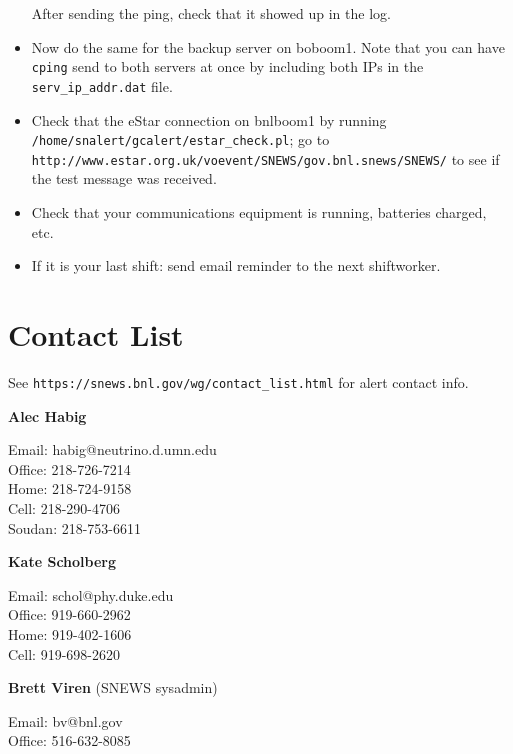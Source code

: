 \documentclass{article}
\begin{document}
\begin{itemize}
After sending the ping, check that it showed up in the log. 

\item Now do the same for the backup server on boboom1.  Note that you 
can have \texttt{cping}
send to both servers at once by including both IPs in the 
\texttt{serv\_ip\_addr.dat} file.

\item Check that the eStar connection on bnlboom1 by running
\texttt{/home/snalert/gcalert/estar\_check.pl}; go to
\texttt{http://www.estar.org.uk/voevent/SNEWS/gov.bnl.snews/SNEWS/} to see
if the test message was received.

\item Check that your communications equipment is running,
batteries charged, etc.

\item If it is your last shift: send email reminder to the
next shiftworker.

\end{itemize}

\newpage

\section{Contact List}      


See \texttt{https://snews.bnl.gov/wg/contact\_list.html} for 
alert contact info.\\
\vspace{0.05in}

\noindent
\textbf{Alec Habig}

\noindent
Email: habig@neutrino.d.umn.edu\\
Office: 218-726-7214\\
Home: 218-724-9158\\
Cell: 218-290-4706\\
Soudan: 218-753-6611\\

\vspace{0.05in}

\noindent
\textbf{Kate Scholberg}

\noindent
Email: schol@phy.duke.edu\\
Office: 919-660-2962\\
Home: 919-402-1606 \\
Cell: 919-698-2620\\

\vspace{0.05in}

\noindent
\textbf{Brett Viren} (SNEWS sysadmin)

\noindent
Email: bv@bnl.gov\\
Office: 516-632-8085\\
\end{document}
